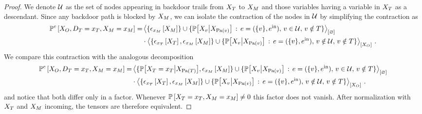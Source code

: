 \begin{proof}
    We denote $\mathcal{U}$ as the set of nodes appearing in backdoor trails from $X_{T}$ to $X_{M}$ and those variables having a variable in $X_{T}$ as a descendant.
    Since any backdoor path is blocked by $X_{M}$, we can isolate the contraction of the nodes in $\mathcal{U}$ by simplifying the contraction as
    \begin{align*}
        \mathbb{P}^{c}\left[X_{O},D_{T}=x_{T},X_{M}=x_{M}\right]
        =
        &\left\langle 
            \{\epsilon_{x_{M}}\left[X_{M}\right]\} \cup
            \{\mathbb{P}\big[X_{v}\big|X_{\mathrm{Pa}(v)}\big]
            \,:\, e = (\{v\},e^{\mathrm{in}}) ,\, v\in\mathcal{U},\, v\notin T \}
        \right\rangle_{\left[ \varnothing \right]} \\
        &\cdot \left\langle 
            \{\epsilon_{x_{T}}\left[X_{T}\right],\epsilon_{x_{M}}\left[X_{M}\right]\} \cup
            \{\mathbb{P}\big[X_{v}\big|X_{\mathrm{Pa}(v)}\big]
            \,:\, e = (\{v\},e^{\mathrm{in}}) ,\, v\notin\mathcal{U},\, v\notin T \}
        \right\rangle_{\left[ X_{O} \right]} \, .
    \end{align*}
    We compare this contraction with the analogous decomposition
    \begin{align*}
        \mathbb{P}^{c}\left[X_{O},D_{T}=x_{T},X_{M}=x_{M}\right]
        =
        &\left\langle 
            \{\mathbb{P}\big[X_{T}=x_{T}\big|X_{\mathrm{Pa}(T)}\big],\epsilon_{x_{M}}\left[X_{M}\right]\} \cup
            \{\mathbb{P}\big[X_{v}\big|X_{\mathrm{Pa}(v)}\big]
            \,:\, e = (\{v\},e^{\mathrm{in}}) ,\, v\in\mathcal{U},\, v\notin T \}
        \right\rangle_{\left[ \varnothing \right]} \\
        &\cdot \left\langle 
            \{\epsilon_{x_{T}}\left[X_{T}\right],\epsilon_{x_{M}}\left[X_{M}\right]\} \cup
            \{\mathbb{P}\big[X_{v}\big|X_{\mathrm{Pa}(v)}\big]
            \,:\, e = (\{v\},e^{\mathrm{in}}) ,\, v\notin\mathcal{U},\, v\notin T \}
        \right\rangle_{\left[ X_{O} \right]} \, .
    \end{align*}
    and notice that both differ only in a factor.
    Whenever $\mathbb{P}\left[X_{T}=x_{T},X_{M}=x_{M}\right]\neq 0$ this factor does not vanish.
    After normalization with $X_{T}$ and $X_{M}$ incoming, the tensors are therefore equivalent.
\end{proof}


